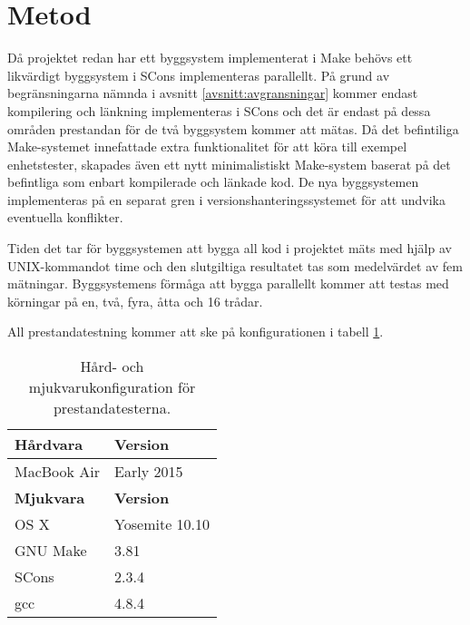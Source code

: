 \section{Metod}
Då projektet redan har ett byggsystem implementerat i Make behövs ett likvärdigt byggsystem i SCons implementeras parallellt. På grund av begränsningarna nämnda i avsnitt \ref{avsnitt:avgransningar} kommer endast kompilering och länkning implementeras i SCons och det är endast på dessa områden prestandan för de två byggsystem kommer att mätas. Då det befintiliga Make-systemet innefattade extra funktionalitet för att köra till exempel enhetstester, skapades även ett nytt minimalistiskt Make-system baserat på det befintliga som enbart kompilerade och länkade kod. De nya byggsystemen implementeras på en separat gren i versionshanteringssystemet för att undvika eventuella konflikter.

Tiden det tar för byggsystemen att bygga all kod i projektet mäts med hjälp av UNIX-kommandot time och den slutgiltiga resultatet tas som medelvärdet av fem mätningar. Byggsystemens förmåga att bygga parallellt kommer att testas med körningar på en, två, fyra, åtta och 16 trådar.

All prestandatestning kommer att ske på konfigurationen i tabell \ref{tabell:konfig}.

\begin{table}[h!]
  \centering
  \begin{tabular}{|l|l|}
    \hline
    \textbf{Hårdvara} & \textbf{Version} \\ \hline
    MacBook Air & Early 2015 \\ \hline
    \textbf{Mjukvara} & \textbf{Version} \\ \hline
    OS X & Yosemite 10.10 \\ \hline
    GNU Make & 3.81 \\ \hline
    SCons & 2.3.4 \\ \hline
    gcc & 4.8.4 \\ \hline
  \end{tabular}
  \caption{Hård- och mjukvarukonfiguration för prestandatesterna.}
  \label{tabell:konfig}
\end{table}


